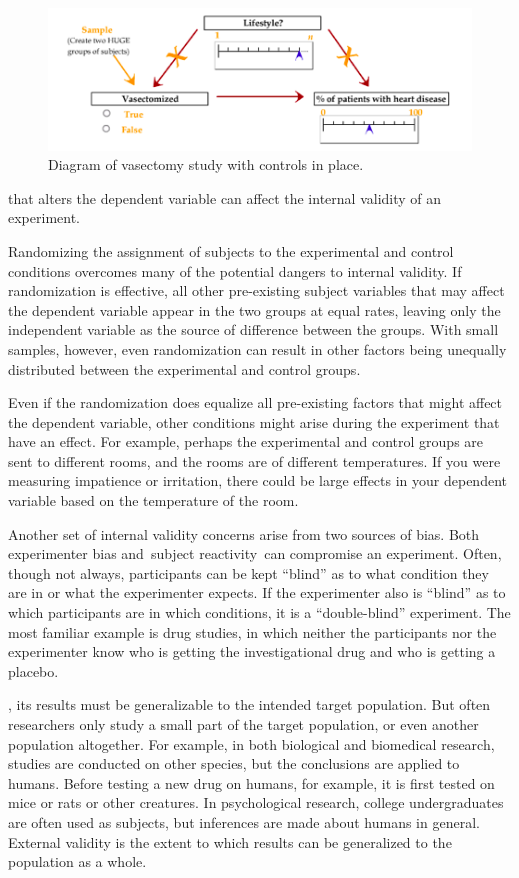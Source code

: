 \begin{refsection}
\begin{figure}\includegraphics{../images/hypothesis5.png}\caption{Diagram of vasectomy study with controls in place.}\label{fig:hypothesis5}\end{figure}

 that alters the dependent variable can affect the internal validity of an experiment. 

Randomizing the assignment of subjects to the experimental and control conditions overcomes many of the potential dangers to internal validity. If randomization is effective, all other pre-existing subject variables that may affect the dependent variable appear in the two groups at equal rates, leaving only the independent variable as the source of difference between the groups. With small samples, however, even randomization can result in other factors being unequally distributed between the experimental and control groups. 

Even if the randomization does equalize all pre-existing factors that might affect the dependent variable, other conditions might arise during the experiment that have an effect. For example, perhaps the experimental and control groups are sent to different rooms, and the rooms are of different temperatures. If you were measuring impatience or irritation, there could be large effects in your dependent variable based on the temperature of the room.

Another set of internal validity concerns arise from two sources of bias. Both experimenter bias and subject reactivity can compromise an experiment. Often, though not always, participants can be kept ``blind'' as to what condition they are in or what the experimenter expects. If the experimenter also is ``blind'' as to which participants are in which conditions, it is a ``double-blind'' experiment. The most familiar example is drug studies, in which neither the participants nor the experimenter know who is getting the investigational drug and who is getting a placebo.

, its results must be generalizable to the intended target population. But often researchers only study a small part of the target population, or even another population altogether. For example, in both biological and biomedical research, studies are conducted on other species, but the conclusions are applied to humans. Before testing a new drug on humans, for example, it is first tested on mice or rats or other creatures. In psychological research, college undergraduates are often used as subjects, but inferences are made about humans in general. External validity is the extent to which results can be generalized to the population as a whole.


\end{refsection}
